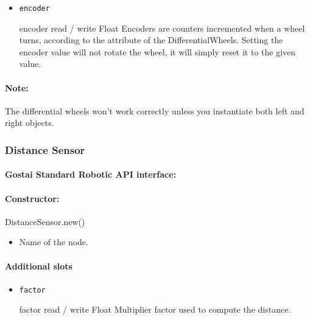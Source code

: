 \begin{itemize}

\item \lstinline|encoder|
\begin{attribute}{encoder}
  {read / write}
  {Float}
  {}
  Encoders are counters incremented when a wheel turns, according to
  the  \webots attribute of the
  DifferentialWheels.  Setting the encoder value will not rotate the
  wheel, it will simply reset it to the given value.
\end{attribute}

\end{itemize}

\paragraph{Note:} The differential wheels won't work correctly unless
you instantiate both left and right objects.

\subsubsection{Distance Sensor}

\paragraph{Gostai Standard Robotic API interface:} 

\paragraph{Constructor:} DistanceSensor.new()

\begin{itemize}
\item {} Name of the \webots node.
\end{itemize}

\paragraph{Additional slots}

\begin{itemize}
\item \lstinline|factor|
\begin{attribute}{factor}
  {read / write}
  {Float}
  {}
  Multiplier factor used to compute the distance.
\end{attribute}
\end{itemize}

